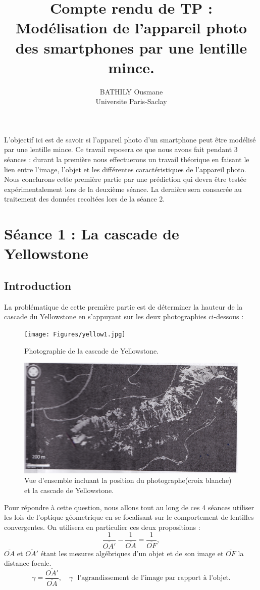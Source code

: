 \documentclass[12pt,a4paper]{article}
\title{Compte rendu de TP : Mod\'elisation de l'appareil photo des smartphones par une lentille mince.}
\author{BATHILY Ousmane \\ Universite Paris-Saclay}
\date{}
\begin{document}
\maketitle
L'objectif ici est de savoir si l'appareil photo d'un smartphone peut \^etre mod\'elis\'e par une lentille mince. Ce travail reposera ce que nous avons fait pendant 3 s\'eances : durant la premi\`ere nous effectuerons un travail th\'eorique en faisant le lien entre l'image, l'objet et les différentes caract\'eristiques de l'appareil photo. Nous conclurons cette première partie par une pr\'ediction qui devra \^etre test\'ee exp\'erimentalement lors de la deuxi\`eme s\'eance. La derni\`ere sera consacr\'ee au traitement des donn\'ees recolt\'ees lors de la s\'eance 2.
\section{S\'eance 1 : La cascade de Yellowstone}
\subsection{Introduction}
La probl\'ematique de cette premi\`ere partie est de d\'eterminer la hauteur de la cascade du Yellowstone en s'appuyant sur les deux photographies ci-dessous :
\begin{figure}[H]
\begin{center}
\texttt{[image: Figures/yellow1.jpg]}   
\caption{Photographie de la cascade de Yellowstone.}
\includegraphics[scale=0.6]{Figures/yellow2.jpg}
\caption{Vue d'ensemble incluant la position du photographe(croix blanche) et la cascade de Yellowstone.}
\label{fig1}
\end{center}
\end{figure}

Pour répondre à cette question, nous allons tout au long de ces 4 séances utiliser les lois de l'optique géometrique en se focalisant sur le comportement de lentilles convergentes. On utilisera en particulier ces deux propositions : 
\begin{equation}
\frac{1}{\overline{OA'}} - \frac{1}{\overline{OA}} = \frac{1}{\overline{OF}},
\end{equation}
$\overline{OA}$ et $\overline{OA'}$ étant les mesures algébriques d'un objet et de son image et $\overline{OF}$ la distance focale.
\begin{equation}
\gamma = \frac{\overline{OA'}}{\overline{OA}}, \quad \text{$\gamma$~~l'agrandissement de l'image par rapport à l'objet.}
\end{equation}
\end{document}
